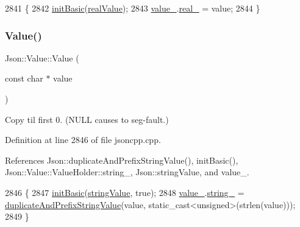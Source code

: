\begin{DoxyCode}
2841                          \{
2842   \hyperlink{class_json_1_1_value_a32b86b71564157f40f880f5736be822a}{initBasic}(\hyperlink{namespace_json_a7d654b75c16a57007925868e38212b4eab837c7b869c14d8be712deb45c9e490e}{realValue});
2843   \hyperlink{class_json_1_1_value_aef578244546212705b9f81eb84d7e151}{value\_}.\hyperlink{union_json_1_1_value_1_1_value_holder_af0c5ca724e5fe3a15db773d750e2351e}{real\_} = value;
2844 \}
\end{DoxyCode}
\mbox{\label{class_json_1_1_value_ad87b849356816aca75995dd07302e49d}} 
\subsubsection{\texorpdfstring{Value()}{Value()}\hspace{0.1cm}{\footnotesize\ttfamily [7/12]}}
{\footnotesize\ttfamily Json\+::\+Value\+::\+Value (\begin{DoxyParamCaption}\item[{const char $\ast$}]{value }\end{DoxyParamCaption})}



Copy til first 0. (N\+U\+LL causes to seg-\/fault.) 



Definition at line 2846 of file jsoncpp.\+cpp.



References Json\+::duplicate\+And\+Prefix\+String\+Value(), init\+Basic(), Json\+::\+Value\+::\+Value\+Holder\+::string\+\_\+, Json\+::string\+Value, and value\+\_\+.


\begin{DoxyCode}
2846                               \{
2847   \hyperlink{class_json_1_1_value_a32b86b71564157f40f880f5736be822a}{initBasic}(\hyperlink{namespace_json_a7d654b75c16a57007925868e38212b4ea804ef857affea2d415843c73f261c258}{stringValue}, \textcolor{keyword}{true});
2848   \hyperlink{class_json_1_1_value_aef578244546212705b9f81eb84d7e151}{value\_}.\hyperlink{union_json_1_1_value_1_1_value_holder_a70ac2b153bc405527baa3850d2ddc3cb}{string\_} = \hyperlink{namespace_json_a9795a09a0141d1f12d307c4386aeaee6}{duplicateAndPrefixStringValue}(value, 
      static\_cast<unsigned>(strlen(value)));
2849 \}
\end{DoxyCode}
\mbox{\label{class_json_1_1_value_a39fa09d1902efbd4350e1236db920571}} 
